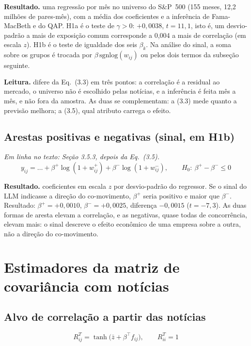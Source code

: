\documentclass[11pt,a4paper]{article}
\newcommand{\resultado}[1]{\par\textbf{Resultado.} #1}
\newcommand{\leitura}[1]{\par\textbf{Leitura.} #1}
\begin{document}
\resultado{uma regressão por mês no universo do S\&P~500 (155 meses, 12,2 milhões de pares-mês), com a
média dos coeficientes e a inferência de Fama-MacBeth e do QAP. H1a é o teste de $\gamma>0$: $+0{,}0038$,
$t=11{,}1$, isto é, um desvio-padrão a mais de exposição comum corresponde a 0,004 a mais de correlação
(em escala $z$). H1b é o teste de igualdade dos seis $\beta_k$. Na análise do sinal, a soma sobre os grupos
é trocada por $\beta\,\mathrm{sgnlog}(w_{ij})$ ou pelos dois termos da subseção seguinte.}

\leitura{difere da Eq.~(3.3) em três pontos: a correlação é a residual ao mercado, o universo não é
escolhido pelas notícias, e a inferência é feita mês a mês, e não fora da amostra. As duas se
complementam: a (3.3) mede quanto a previsão melhora; a (3.5), qual atributo carrega o efeito.}

\subsection{Arestas positivas e negativas (sinal, em H1b)}

{\small\textit{Em linha no texto: Seção 3.5.3, depois da Eq.~(3.5).}}
\[
  y_{ij}=\dots+\beta^+\log(1+w^+_{ij})+\beta^-\log(1+w^-_{ij}),\qquad H_0:\ \beta^+-\beta^-\le0
\]

\resultado{coeficientes em escala $z$ por desvio-padrão do regressor. Se o sinal do LLM indicasse a
direção do co-movimento, $\beta^+$ seria positivo e maior que $\beta^-$. Resultado: $\beta^+=+0{,}0010$,
$\beta^-=+0{,}0025$, diferença $-0{,}0015$ ($t=-7{,}3$). As duas formas de aresta elevam a correlação, e as
negativas, quase todas de concorrência, elevam mais: o sinal descreve o efeito econômico de uma empresa
sobre a outra, não a direção do co-movimento.}

\section{Estimadores da matriz de covariância com notícias}

\subsection{Alvo de correlação a partir das notícias}

\begin{equation}
  R^T_{ij} = \tanh\!\bigl(\bar z + \beta^\top f_{ij}\bigr),\qquad R^T_{ii}=1
  \tag{3.6}
\end{equation}
\end{document}
